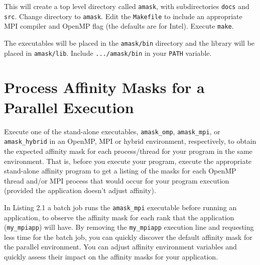 \documentclass[10pt,a4paper]{report}
\begin{document}
This will create a top level directory called \verb+amask+, with subdirectories 
\verb+docs+ and \verb+src+.  Change directory to  \verb+amask+. Edit the \verb+Makefile+ to include an appropriate
MPI compiler and OpenMP flag (the defaults are for Intel).  Execute \verb+make+.





The executables will be placed in the \verb+amask/bin+ directory and the library 
will be placed in \verb+amask/lib+. Include \verb+.../amask/bin+ in your \verb+PATH+ variable.

\FloatBarrier
\chapter{Process Affinity Masks for a Parallel Execution}


Execute one of the stand-alone executables, \verb+amask_omp+, \verb+amask_mpi+, or \\
\verb+amask_hybrid+ in an OpenMP, MPI or hybrid environment, 
respectively, to obtain the expected affinity mask for each 
process/thread for your program in the same environment.  That is,
before you execute your program, execute the appropriate stand-alone affinity
program to get a listing of the masks for each OpenMP thread and/or MPI process
that would occur for your program execution (provided the application doesn't adjust affinity).

In Listing 2.1
a batch job runs the \verb+amask_mpi+ executable before running an application, to observe
the affinity mask for each rank that the application (\verb+my_mpiapp+) will have.
By removing the \verb+my_mpiapp+ execution line and requesting less time for the batch job, you
can quickly discover the default affinity mask for the parallel environment. 
You can adjust affinity environment variables and quickly assess their impact on 
the affinity masks for your application.  
\end{document}
